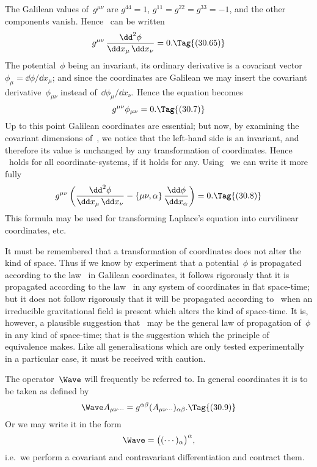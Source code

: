 \documentclass[12pt]{book}
\begin{document}
The Galilean values of~$g^{\mu\nu}$ are $g^{44} = 1$, $g^{11} = g^{22} = g^{33} = -1$, and the other
components vanish. Hence ~can be written
\[
g^{\mu\nu}\, \frac{\dd^{2} \phi}{\dd x_{\mu}\, \dd x_{\nu}} = 0.
\Tag{(30.65)}
\]
The potential~$\phi$ being an invariant, its ordinary derivative is a covariant
vector $\phi_{\mu} = \dd\phi/\dd x_{\mu}$; and since the coordinates are Galilean we may insert
the covariant derivative~$\phi_{\mu\nu}$ instead of~$\dd \phi_{\mu}/\dd x_{\nu}$. Hence the equation becomes
\[
g^{\mu\nu} \phi_{\mu\nu} = 0.
\Tag{(30.7)}
\]
Up to this point Galilean coordinates are essential; but now, by examining the
covariant dimensions of~, we notice that the left-hand side is an invariant,
and therefore its value is unchanged by any transformation of coordinates.
Hence ~holds for all coordinate-systems, if it holds for any. Using~
we can write it more fully
\[
g^{\mu\nu} \left(\frac{\dd^{2}\phi}{\dd x_{\mu}\, \dd x_{\nu}} - \{\mu\nu, \alpha\}\, \frac{\dd\phi}{\dd x_{\alpha}}\right) = 0.
\Tag{(30.8)}
\]
This formula may be used for transforming Laplace's equation into curvilinear
coordinates, etc.

It must be remembered that a transformation of coordinates does not alter
the kind of space. Thus if we know by experiment that a potential~$\phi$ is
propagated according to the law~ in Galilean coordinates, it follows
rigorously that it is propagated according to the law~ in any system of
coordinates in flat space-time; but it does not follow rigorously that it will
be propagated according to~ when an irreducible gravitational field is
present which alters the kind of space-time. It is, however, a plausible
suggestion that ~may be the general law of propagation of~$\phi$ in any kind
of space-time; that is the suggestion which the principle of equivalence makes.
Like all generalisations which are only tested experimentally in a particular
case, it must be received with caution.

The operator~$\Wave$ will frequently be referred to. In general coordinates it
%
%
is to be taken as defined by
\[
\Wave A_{\mu\nu\cdots} = g^{\alpha\beta} (A_{\mu\nu\cdots})_{\alpha\beta}.
\Tag{(30.9)}
\]
Or we may write it in the form
\[
\Wave = \bigl((\cdots)_{\alpha}\bigr)^{\alpha},
\]
i.e.\ we perform a covariant and contravariant differentiation and contract
them.
\end{document}
